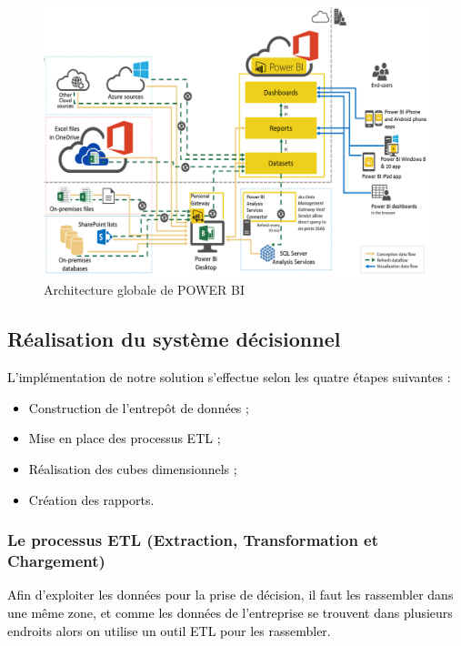 \begin{figure}[H]
	\begin{center}
		\includegraphics[width=1\linewidth]{Projet_O365/archi_BI}
\end{center}
	\caption{Architecture globale de POWER BI}
	\label{fig:12}	
\end{figure}	

\subsection*{Réalisation du système décisionnel}

\textcolor{black}{L’implémentation de notre solution s’effectue selon les quatre étapes suivantes :
\begin{itemize}
	\item   Construction de l’entrepôt de données ;
	\item	Mise en place des processus ETL ;
	\item	Réalisation des cubes dimensionnels ;
	\item	Création des rapports.
\end{itemize}
}
		 	
\subsubsection{Le processus ETL (Extraction, Transformation et Chargement)}

\textcolor{black}{
Afin d’exploiter les données pour la prise de décision, il faut les rassembler dans une même zone, et comme les données de l’entreprise se trouvent dans plusieurs endroits alors on utilise un outil ETL pour les rassembler.}


